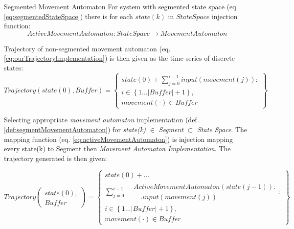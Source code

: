 \begin{definition}{Segmented Movement Automaton}\label{def:segmentedMovementAutomaton}
    For system with segmented state space (eq. \ref{eq:segmentedStateSpace}) there is for each $state(k)$ in $StateSpace$ injection function:
    \begin{equation} \label{eq:activeMovementAutomaton}
        ActiveMovementAutomaton:StateSpace\to MovementAutomaton
    \end{equation}

\noindent Trajectory of non-segmented movement automaton (eq. \ref{eq:ourTrajectoryImplementation}) is then given as the time-series of discrete states:
\begin{equation}\label{eq:ourTrajectoryImplementation}
    Trajectory(state(0),Buffer)= \left\{\begin{gathered}state(0)+\sum_{j=0}^{i-1} input(movement(j)):\\i \in\left\{1\dots |Buffer|+1\right\}, \\movement(\cdot) \in Buffer\end{gathered}\right\}
\end{equation}
    
\noindent Selecting appropriate \emph{movement automaton} implementation (def. \ref{def:segmentMovementAutomaton}) for \emph{state(k)} $\in$ \emph{Segment} $\subset$ \emph{State Space}. The mapping function (eq. \ref{eq:activeMovementAutomaton}) is injection mapping every state(k) to Segment then \emph{Movement Automaton Implementation}. The trajectory generated is then given:
    
    \begin{equation}\label{eq:ourTrajectoryImplementationSegmented}
        Trajectory\left(\begin{gathered}state(0),\\Buffer\end{gathered}\right)= 
        \left\{
            \begin{gathered}
                state(0)+\dots\\\sum_{j=0}^{i-1} 
                    \begin{aligned} 
                        &ActiveMovementAutomaton(state(j-1)).\\
                        &\quad.input(movement(j))
                    \end{aligned}:\\
                i \in\left\{1\dots |Buffer|+1\right\}, \\
                movement(\cdot) \in Buffer
            \end{gathered}
        \right\}
    \end{equation}
    
\end{definition}


